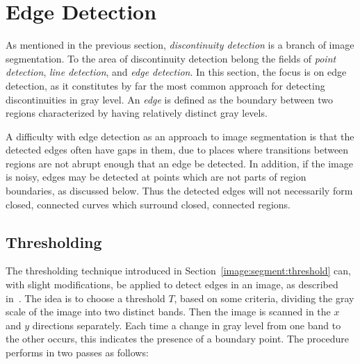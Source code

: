 
\section{Edge Detection}
\label{image:edge}

As mentioned in the previous section, {\em discontinuity detection\/}
is a branch of image segmentation.  To the area of discontinuity
detection belong the fields of {\em point detection\/}, {\em line
  detection\/}, and {\em edge detection\/}.  In this section, the
focus is on edge detection, as it constitutes by far the most common
approach for detecting discontinuities in gray level.  An {\em edge\/}
is defined as the boundary between two regions characterized by having
relatively distinct gray levels.

A difficulty with edge detection as an approach to image segmentation
is that the detected edges often have gaps in them, due to places
where transitions between regions are not abrupt enough that an edge
be detected.  In addition, if the image is noisy, edges may be
detected at points which are not parts of region boundaries, as
discussed below.  Thus the detected edges will not necessarily form
closed, connected curves which surround closed, connected regions.

\subsection{Thresholding}
\label{image:edge:threshold}

The thresholding technique introduced in
Section~\ref{image:segment:threshold} can, with slight modifications,
be applied to detect edges in an image, as described in~\cite{digim}.
The idea is to choose a threshold $T$, based on some criteria,
dividing the gray scale of the image into two distinct bands.  Then
the image is scanned in the $x$ and $y$ directions separately.  Each
time a change in gray level from one band to the other occurs, this
indicates the presence of a boundary point.  The procedure performs in
two passes as follows:

